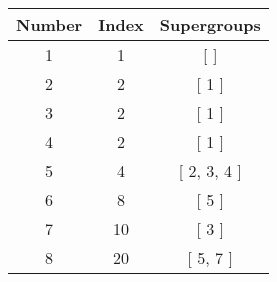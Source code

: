 \begin{center}
\begin{longtable}[H]{|| c c c ||}
\hline
Number &  Index &  Supergroups
\\\hline
1 & 1 & [  ]
\\\hline
2 & 2 & [ 1 ]
\\\hline
3 & 2 & [ 1 ]
\\\hline
4 & 2 & [ 1 ]
\\\hline
5 & 4 & [ 2, 3, 4 ]
\\\hline
6 & 8 & [ 5 ]
\\\hline
7 & 10 & [ 3 ]
\\\hline
8 & 20 & [ 5, 7 ]
\\\hline
\end{longtable}
\end{center}
